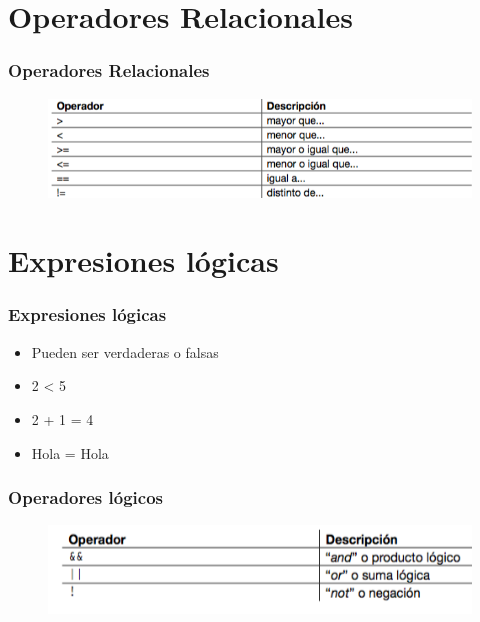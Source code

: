 \documentclass[handout]{beamer}
\begin{document}
\section{Operadores Relacionales} %
\label{sec:operadores_relacionales}
\begin{frame}[t]\frametitle{Operadores Relacionales}
    
\begin{figure}[tb]
  \centering
  \includegraphics[scale=.6]{./img/oprela}
\end{figure}

\end{frame}

\section{Expresiones lógicas} %
\label{sec:exmpresiones_logicas}
\begin{frame}[t]\frametitle{Expresiones lógicas}
        
\begin{itemize}
  \item Pueden ser verdaderas o falsas
  \item 2 < 5
  \item 2 + 1 = 4
  \item Hola = Hola
\end{itemize}
\end{frame}

\begin{frame}[t]\frametitle{Operadores lógicos}
    
\begin{figure}[tb]
  \centering
  \includegraphics[scale=.7]{./img/oplog}
\end{figure}

\end{frame}
\end{document}
